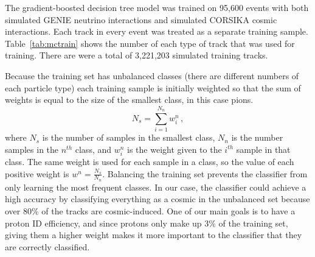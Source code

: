     The gradient-boosted decision tree model was trained on 95,600 events with
    both simulated GENIE neutrino interactions and simulated CORSIKA cosmic
    interactions. Each track in every event was treated as a separate training
    sample. Table~\ref{tab:mctrain} shows the number of each type of track that
    was used for training. There are were a total of 3,221,203 simulated
    training tracks.

    Because the training set has unbalanced classes (there are different
    numbers of each particle type) each training sample is initially weighted
    so that the sum of weights is equal to the size of the smallest class, in
    this case pions.
    \begin{equation*}
      N_s = \sum_{i=1}^{N_{n}}w^n_i \,,
    \end{equation*}
    where $N_s$ is the number of samples in the smallest class, $N_{n}$ is the
    number samples in the $n^{th}$ class, and $w^n_i$ is the weight given to
    the $i^{th}$ sample in that class. The same weight is used for each sample
    in a class, so the value of each positive weight is
    $w^n=\frac{N_s}{N_{n}}$.  Balancing the training set prevents the
    classifier from only learning the most frequent classes. In our case, the
    classifier could achieve a high accuracy by classifying everything as a
    cosmic in the unbalanced set because over 80\% of the tracks are
    cosmic-induced. One of our main goals is to have a proton ID efficiency,
    and since protons only make up 3\% of the training set, giving them a
    higher weight makes it more important to the classifier that they are
    correctly classified.

